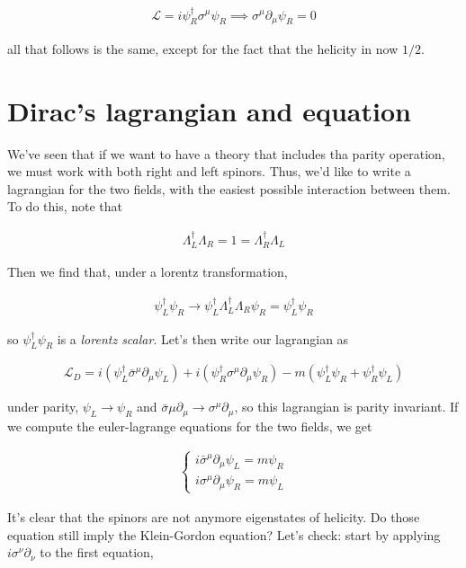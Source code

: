 \documentclass{report}
\begin{document}
\begin{align}
    \mathcal{L} = i\psi_R^\dagger\sigma^\mu\psi_R \implies \sigma^\mu\partial_\mu\psi_R = 0 
\end{align}

all that follows is the same, except for the fact that the helicity in now \(1/2\). 

\section{Dirac's lagrangian and equation}

We've seen that if we want to have a theory that includes tha parity operation, we must work with both right and left spinors. Thus, we'd like to write a lagrangian for the two fields, with the easiest possible interaction between them. To do this, note that 

\begin{align}
    \Lambda^\dagger_L \Lambda_R = 1 = \Lambda_R^\dagger\Lambda_L
\end{align}

Then we find that, under a lorentz transformation, 

\begin{align}
    \psi_L^\dagger\psi_R \rightarrow \psi_L^\dagger\Lambda_L^\dagger\Lambda_R\psi_R = \psi_L^\dagger\psi_R
\end{align}

so \(\psi_L^\dagger\psi_R\) is a \emph{lorentz scalar}. Let's then write our lagrangian as 

\begin{align}
    \mathcal{L}_{D} = i(\psi_L^\dagger\bar{\sigma}^\mu\partial_\mu \psi_L) + i(\psi_R^\dagger\sigma^\mu\partial_\mu \psi_R) -m(\psi^\dagger_L\psi_R + \psi_R^\dagger\psi_L)
\end{align}

under parity, \(\psi_L \rightarrow \psi_R\) and \(\bar{\sigma}\mu\partial_\mu \rightarrow \sigma^\mu\partial_\mu\), so this lagrangian is parity invariant. If we compute the euler-lagrange equations for the two fields, we get

\begin{align}
    \begin{cases}
        i\bar{\sigma}^\mu\partial_\mu\psi_L = m\psi_R \\
        i\sigma^\mu\partial_\mu\psi_R = m\psi_L
    \end{cases}
\end{align}

It's clear that the spinors are not anymore eigenstates of helicity. Do those equation still imply the Klein-Gordon equation? Let's check: start by applying \(i\sigma^\nu\partial_\nu\) to the first equation, 
\end{document}
